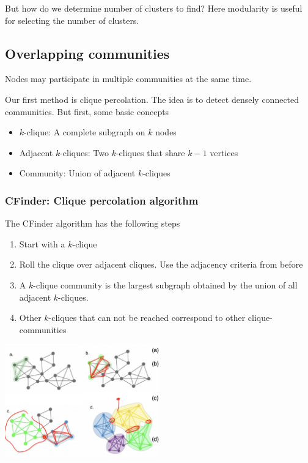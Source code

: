     But how do we determine number of clusters to find? Here modularity is useful for selecting the number of clusters. 
        

\subsection{Overlapping communities}
    Nodes may participate in multiple communities at the same time. 
    
    Our first method is clique percolation. The idea is to detect densely connected communities. But first, some basic concepts
    
    \begin{itemize}
        \item $k$-clique: A complete subgraph on $k$ nodes
        \item Adjacent $k$-cliques: Two $k$-cliques that share $k-1$ vertices
        \item Community: Union of adjacent $k$-cliques
    \end{itemize}
    
\subsubsection{CFinder: Clique percolation algorithm}
    The CFinder algorithm has the following steps
    
    \begin{enumerate}
        \item Start with a $k$-clique
        \item Roll the clique over adjacent cliques. Use the adjacency criteria from before
        \item A $k$-clique community is the largest subgraph obtained by the union of all adjacent $k$-cliques. 
        \item Other $k$-cliques that can not be reached correspond to other clique-communities
    \end{enumerate}

\begin{center}
    \includegraphics[width=0.5\textwidth]{images/CFinder.png}
\end{center}

